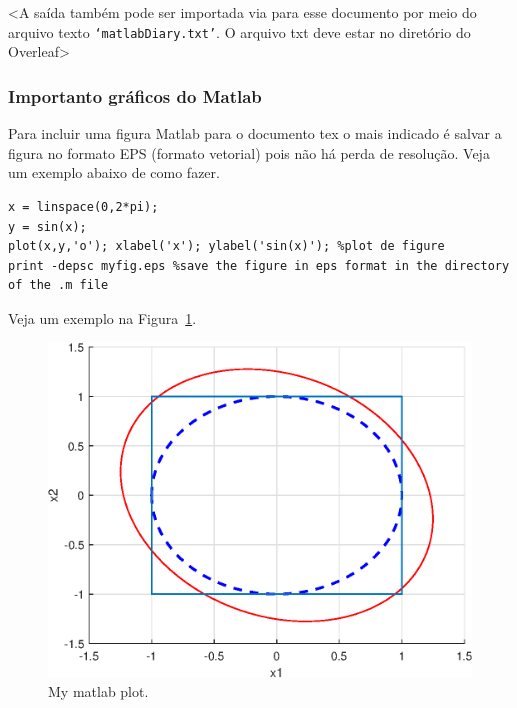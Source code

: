\documentclass[a4paper,12pt]{article}
\begin{document}
<A saída também pode ser importada via \verb|| para esse documento por meio do arquivo texto \texttt{`matlabDiary.txt'}. O arquivo txt deve estar no diretório do Overleaf>




\subsubsection*{Importanto gráficos do Matlab}

Para incluir uma figura Matlab para o documento tex o mais indicado é salvar a figura no formato EPS (formato vetorial) pois não há perda de resolução. Veja um exemplo abaixo de como fazer.
\begin{lstlisting}
x = linspace(0,2*pi);
y = sin(x);
plot(x,y,'o'); xlabel('x'); ylabel('sin(x)'); %plot de figure
print -depsc myfig.eps %save the figure in eps format in the directory of the .m file
\end{lstlisting}

Veja um exemplo na Figura~\ref{fig:theFig}.
\begin{figure}[H]
	\centerline{\includegraphics[scale=0.6]{figmatlab}}		
	\caption{My matlab plot. \label{fig:theFig}}
\end{figure}
\end{document}
